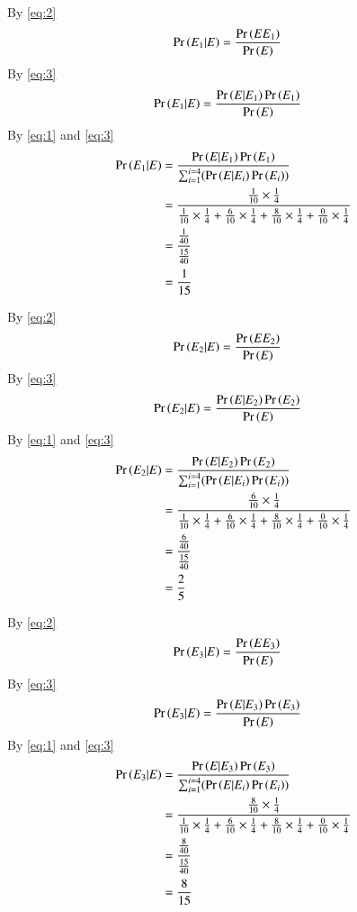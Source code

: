 \documentclass[journal,12pt]{IEEEtran}
\begin{document}
By \eqref{eq:2}
\begin{align}
\Pr\left(E_1|E\right) &=\frac{\Pr\left(EE_1\right)}{\Pr\left(E\right)}
\end{align}
By \eqref{eq:3}
\begin{align}
\Pr\left(E_1|E\right) &=\frac{\Pr\left(E|E_1\right)\Pr\left(E_1\right)}{\Pr\left(E\right)}
\end{align}
By \eqref{eq:1} and \eqref{eq:3}
\begin{align}
\Pr\left(E_1|E\right) &=\frac{\Pr\left(E|E_1\right)\Pr\left(E_1\right)}{\sum_{i=1}^{i=4}(\Pr\left(E|E_i\right)\Pr\left(E_i\right))}\\
        &= \frac{\frac{1}{10}\times\frac{1}{4}}{\frac{1}{10}\times\frac{1}{4}+\frac{6}{10}\times\frac{1}{4}+\frac{8}{10}\times\frac{1}{4}+\frac{0}{10}\times\frac{1}{4}}\\
        &= \frac{\frac{1}{40}}{\frac{15}{40}}\\
        &= \frac{1}{15}
\end{align}



By \eqref{eq:2}
\begin{align}
\Pr\left(E_2|E\right) &=\frac{\Pr\left(EE_2\right)}{\Pr\left(E\right)}
\end{align}
By \eqref{eq:3}
\begin{align}
\Pr\left(E_2|E\right) &=\frac{\Pr\left(E|E_2\right)\Pr\left(E_2\right)}{\Pr\left(E\right)}
\end{align}
By \eqref{eq:1} and \eqref{eq:3}
\begin{align}
\Pr\left(E_2|E\right) &=\frac{\Pr\left(E|E_2\right)\Pr\left(E_2\right)}{\sum_{i=1}^{i=4}(\Pr\left(E|E_i\right)\Pr\left(E_i\right))}\\
        &= \frac{\frac{6}{10}\times\frac{1}{4}}{\frac{1}{10}\times\frac{1}{4}+\frac{6}{10}\times\frac{1}{4}+\frac{8}{10}\times\frac{1}{4}+\frac{0}{10}\times\frac{1}{4}}\\
        &= \frac{\frac{6}{40}}{\frac{15}{40}}\\
        &=\frac{2}{5}
\end{align}



By \eqref{eq:2}
\begin{align}
\Pr\left(E_3|E\right) &=\frac{\Pr\left(EE_3\right)}{\Pr\left(E\right)}
\end{align}
By \eqref{eq:3}
\begin{align}
\Pr\left(E_3|E\right) &=\frac{\Pr\left(E|E_3\right)\Pr\left(E_3\right)}{\Pr\left(E\right)}
\end{align}
By \eqref{eq:1} and \eqref{eq:3}
\begin{align}
\Pr\left(E_3|E\right) &=\frac{\Pr\left(E|E_3\right)\Pr\left(E_3\right)}{\sum_{i=1}^{i=4}(\Pr\left(E|E_i\right)\Pr\left(E_i\right))}\\
        &= \frac{\frac{8}{10}\times\frac{1}{4}}{\frac{1}{10}\times\frac{1}{4}+\frac{6}{10}\times\frac{1}{4}+\frac{8}{10}\times\frac{1}{4}+\frac{0}{10}\times\frac{1}{4}}\\
        &= \frac{\frac{8}{40}}{\frac{15}{40}}\\
        &= \frac{8}{15}
\end{align}
\end{document}
